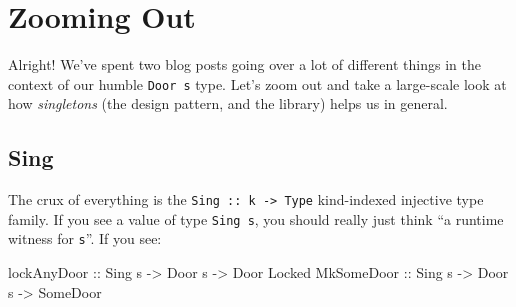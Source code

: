\documentclass[]{article}
\newenvironment{Shaded}{}{}
\newcommand{\CommentTok}[1]{\textcolor[rgb]{0.38,0.63,0.69}{\textit{#1}}}
\newcommand{\DataTypeTok}[1]{\textcolor[rgb]{0.56,0.13,0.00}{#1}}
\newcommand{\KeywordTok}[1]{\textcolor[rgb]{0.00,0.44,0.13}{\textbf{#1}}}
\newcommand{\NormalTok}[1]{#1}
\newcommand{\OperatorTok}[1]{\textcolor[rgb]{0.40,0.40,0.40}{#1}}
\newcommand{\OtherTok}[1]{\textcolor[rgb]{0.00,0.44,0.13}{#1}}
\begin{document}
\begin{Shaded}
\end{Shaded}

\section{Zooming Out}\label{zooming-out}

Alright! We've spent two blog posts going over a lot of different things in the
context of our humble \texttt{Door\ s} type. Let's zoom out and take a
large-scale look at how \emph{singletons} (the design pattern, and the library)
helps us in general.

\subsection{Sing}\label{sing}

The crux of everything is the \texttt{Sing\ ::\ k\ -\textgreater{}\ Type}
kind-indexed injective type family. If you see a value of type \texttt{Sing\ s},
you should really just think ``a runtime witness for \texttt{s}''. If you see:

\begin{Shaded}
\begin{Highlighting}[]
\OtherTok{lockAnyDoor ::} \DataTypeTok{Sing}\NormalTok{ s }\OtherTok{{-}\textgreater{}} \DataTypeTok{Door}\NormalTok{ s }\OtherTok{{-}\textgreater{}} \DataTypeTok{Door} \DataTypeTok{\textquotesingle{}Locked}
\DataTypeTok{MkSomeDoor}\OtherTok{  ::} \DataTypeTok{Sing}\NormalTok{ s }\OtherTok{{-}\textgreater{}} \DataTypeTok{Door}\NormalTok{ s }\OtherTok{{-}\textgreater{}} \DataTypeTok{SomeDoor}
\end{Highlighting}
\end{Shaded}
\end{document}
